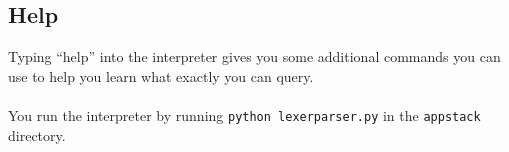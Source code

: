 \subsection{Help} %
\label{sub:help}
Typing ``help'' into the interpreter gives you some additional commands you can use to help you learn what exactly you can query.
\\\\
You run the interpreter by running \verb+python lexerparser.py+ in the \verb+appstack+ directory.

